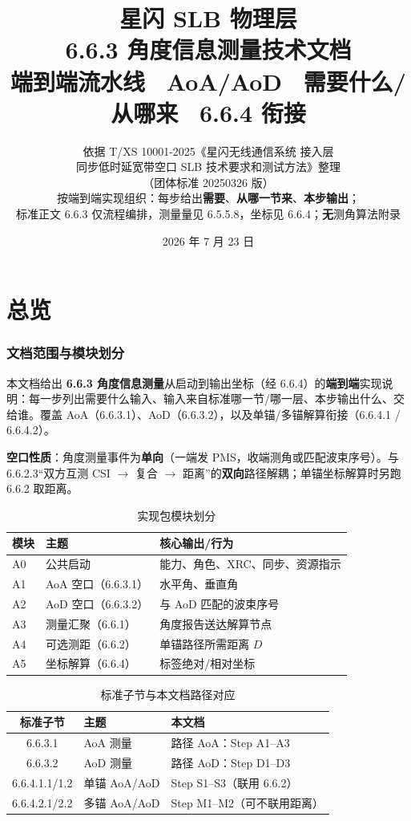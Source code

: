 \documentclass[11pt,a4paper]{ctexart}
\title{%
  \textbf{星闪 SLB 物理层}\\[0.4em]
  \Large 6.6.3 角度信息测量技术文档\\[0.3em]
  \large 端到端流水线 \textbullet\ AoA/AoD \textbullet\ 需要什么/从哪来 \textbullet\ 6.6.4 衔接
}
\author{依据 T/XS 10001-2025《星闪无线通信系统 接入层\\
同步低时延宽带空口 SLB 技术要求和测试方法》整理\\
（团体标准 20250326 版）\\[0.3em]
\small 按端到端实现组织：每步给出\textbf{需要}、\textbf{从哪一节来}、\textbf{本步输出}；\\
\small 标准正文 6.6.3 仅流程编排，测量量见 6.5.5.8，坐标见 6.6.4；\textbf{无}测角算法附录
}
\date{2026 年 7 月 23 日}
\begin{document}
\maketitle
\tableofcontents
\newpage

\part{总览}

\section{文档范围与模块划分}

本文档给出 \textbf{6.6.3 角度信息测量}从启动到输出坐标（经 6.6.4）的\textbf{端到端}实现说明：每一步列出需要什么输入、输入来自标准哪一节/哪一层、本步输出什么、交给谁。覆盖 AoA（6.6.3.1）、AoD（6.6.3.2），以及单锚/多锚解算衔接（6.6.4.1 / 6.6.4.2）。

\textbf{空口性质}：角度测量事件为\textbf{单向}（一端发 PMS，收端测角或匹配波束序号）。与 6.6.2.3``双方互测 CSI $\rightarrow$ 复合 $\rightarrow$ 距离''的\textbf{双向}路径解耦；单锚坐标解算时另跑 6.6.2 取距离。

\begin{table}[h]
\centering
\small
\caption{实现包模块划分}
\begin{tabular}{lll}
\toprule
\textbf{模块} & \textbf{主题} & \textbf{核心输出/行为} \\
\midrule
A0 & 公共启动 & 能力、角色、XRC、同步、资源指示 \\
A1 & AoA 空口（6.6.3.1） & 水平角、垂直角 \\
A2 & AoD 空口（6.6.3.2） & 与 AoD 匹配的波束序号 \\
A3 & 测量汇聚（6.6.1） & 角度报告送达解算节点 \\
A4 & 可选测距（6.6.2） & 单锚路径所需距离 $D$ \\
A5 & 坐标解算（6.6.4） & 标签绝对/相对坐标 \\
\bottomrule
\end{tabular}
\end{table}

\begin{table}[h]
\centering
\small
\caption{标准子节与本文档路径对应}
\begin{tabular}{clp{7cm}}
\toprule
\textbf{标准子节} & \textbf{主题} & \textbf{本文档} \\
\midrule
6.6.3.1 & AoA 测量 & 路径 AoA：Step A1--A3 \\
6.6.3.2 & AoD 测量 & 路径 AoD：Step D1--D3 \\
6.6.4.1.1/1.2 & 单锚 AoA/AoD & Step S1--S3（联用 6.6.2） \\
6.6.4.2.1/2.2 & 多锚 AoA/AoD & Step M1--M2（可不联用距离） \\
\bottomrule
\end{tabular}
\end{table}
\end{document}
